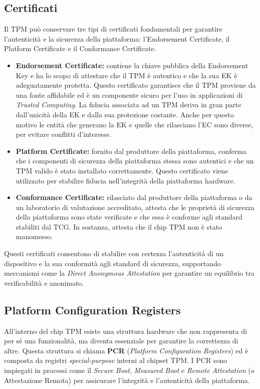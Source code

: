 \subsection{Certificati}
Il TPM può conservare tre tipi di certificati fondamentali per garantire l'autenticità e la sicurezza della piattaforma: l'Endorsement Certificate, il Platform Certificate e il Conformance Certificate.
\begin{itemize}
    \item \textbf{Endorsement Certificate:} contiene la chiave pubblica della Endorsement Key e ha lo scopo di attestare che il TPM è autentico e che la sua EK è adeguatamente protetta. Questo certificato garantisce che il TPM proviene da una fonte affidabile ed è un componente sicuro per l'uso in applicazioni di \textit{Trusted Computing}. La fiducia associata ad un TPM deriva in gran parte dall’unicità della EK e dalla sua protezione costante. Anche per questo motivo le entità che generano la EK e quelle che rilasciano l'EC sono diverse, per evitare conflitti d’interesse.
    \item \textbf{Platform Certificate:} fornito dal produttore della piattaforma, conferma che i componenti di sicurezza della piattaforma stessa sono autentici e che un TPM valido è stato installato correttamente. Questo certificato viene utilizzato per stabilire fiducia nell'integrità della piattaforma hardware.
    \item \textbf{Conformance Certificate:} rilasciato dal produttore della piattaforma o da un laboratorio di valutazione accreditato, attesta che le proprietà di sicurezza della piattaforma sono state verificate e che essa è conforme agli standard stabiliti dal TCG. In sostanza, attesta che il chip TPM non è stato manomesso. 
\end{itemize}

Questi certificati consentono di stabilire con certezza l'autenticità di un dispositivo e la sua conformità agli standard di sicurezza, supportando meccanismi come la \textit{Direct Anonymous Attestation} per garantire un equilibrio tra verificabilità e anonimato. 

\subsection{Platform Configuration Registers}
All’interno del chip TPM esiste una struttura hardware che non rappresenta di per sé una funzionalità, ma diventa essenziale per garantire la correttezza di altre. Questa struttura si chiama \textbf{PCR} (\textit{Platform Configuration Registers}) ed è composta da registri \textit{special-purpose} interni al chipset TPM. I PCR sono impiegati in processi come il \textit{Secure Boot}, \textit{Measured Boot} e \textit{Remote Attestation} (o Attestazione Remota) per assicurare l’integrità e l'autenticità della piattaforma.

